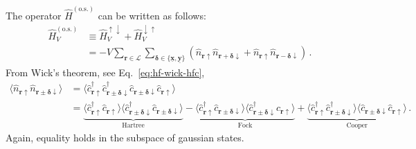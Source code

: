 The operator $\hat H^{(\mathrm{o.s.})}$ can be written as follows:
\begin{align}
	\hat H_V^{(\text{o.s.})} &\equiv \hat H_V^{\uparrow\downarrow}  + \hat H_V^{\downarrow\uparrow} \nonumber \\
	&= - V 
	\sum_{\mathbf{r}\in\mathcal{L}} \sum_{\bm{\delta}\in \lbrace \underline{\mathbf{x}}, \underline{\mathbf{y}} \rbrace} \left(\hat n_{\mathbf{r}\uparrow} \hat n_{\mathbf{r}+\bm{\delta}\downarrow} + \hat n_{\mathbf{r}\uparrow} \hat n_{\mathbf{r}-\bm{\delta}\downarrow}\right) \label{eq:ehm-HV(os)} \, .
\end{align}
From Wick's theorem, see Eq.~\eqref{eq:hf-wick-hfc},
\begin{align}
	\langle 
	\hat n_{\mathbf{r}\uparrow} \hat n_{\mathbf{r} \pm \bm{\delta} \downarrow}
	\rangle &= \langle
	\hat c_{\mathbf{r}\uparrow}^\dagger \hat c_{\mathbf{r} \pm \bm{\delta} \downarrow}^\dagger \hat c_{\mathbf{r} \pm \bm{\delta} \downarrow} \hat c_{\mathbf{r}\uparrow}
	\rangle \nonumber \\
	&=
	\underbrace{
		\langle 
		\hat c_{\mathbf{r}\uparrow}^\dagger \hat c_{\mathbf{r}\uparrow}
		\rangle \langle	
		\hat c_{\mathbf{r} \pm \bm{\delta} \downarrow}^\dagger \hat c_{\mathbf{r} \pm \bm{\delta} \downarrow}
		\rangle
	}_{\text{Hartree}}
	- 
	\underbrace{
		\langle 
		\hat c_{\mathbf{r}\uparrow}^\dagger \hat c_{\mathbf{r} \pm \bm{\delta} \downarrow}
		\rangle \langle	
		\hat c_{\mathbf{r} \pm \bm{\delta} \downarrow}^\dagger \hat c_{\mathbf{r}\uparrow}
		\rangle 
	}_{\text{Fock}}
	+
	\underbrace{
		\langle 
		\hat c_{\mathbf{r}\uparrow}^\dagger \hat c_{\mathbf{r} \pm \bm{\delta} \downarrow}^\dagger
		\rangle \langle	
		\hat c_{\mathbf{r} \pm \bm{\delta} \downarrow} \hat c_{\mathbf{r}\uparrow}
		\rangle 
	}_{\text{Cooper}}	
	\label{eq:ehm-HV(os)-wick} \, .
\end{align}
Again, equality holds in the subspace of gaussian states.

